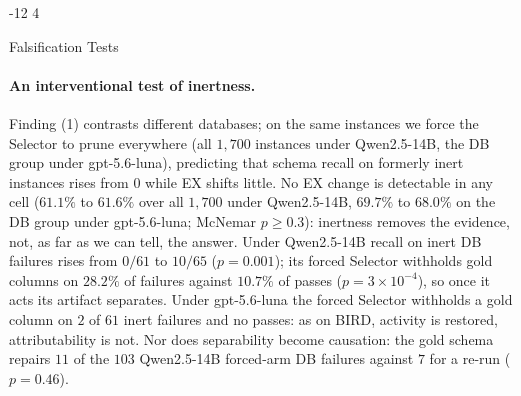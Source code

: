 \documentclass{llncs}
\makeatletter
\renewcommand\subsubsection{\@startsection{subsubsection}{3}{\z@}%
  {-12\p@ \@plus -4\p@ \@minus -4\p@}%
  {4\p@ \@plus 2\p@ \@minus 2\p@}%
  {\normalfont\normalsize\bfseries\boldmath\raggedright}}
\makeatother
\begin{document}
\subsubsection{Falsification Tests}
\label{sec:falsify}

\paragraph{An interventional test of inertness.}
\label{sec:forced}
Finding (1) contrasts different databases; on the same instances we force
the Selector to prune everywhere (all $1{,}700$ instances under
Qwen2.5-14B, the DB group under gpt-5.6-luna), predicting that schema recall
on formerly inert instances rises from $0$ while EX shifts little. No EX
change is detectable in any cell ($61.1\%$ to $61.6\%$ over all $1{,}700$ under
Qwen2.5-14B, $69.7\%$ to $68.0\%$ on the DB group under gpt-5.6-luna;
McNemar $p \ge 0.3$): inertness removes the
evidence, not, as far as we can tell, the answer. Under Qwen2.5-14B recall on inert DB failures rises
from $0/61$ to $10/65$ ($p = 0.001$); its forced Selector withholds gold
columns on $28.2\%$ of failures against $10.7\%$ of passes
($p = 3{\times}10^{-4}$), so once it acts its artifact separates. Under gpt-5.6-luna the forced Selector
withholds a gold column on $2$ of $61$ inert failures and no passes: as on
BIRD, activity is restored, attributability is not. Nor does separability
become causation: the gold schema repairs $11$ of the $103$ Qwen2.5-14B
forced-arm DB failures against $7$ for a re-run ($p = 0.46$).
\end{document}
